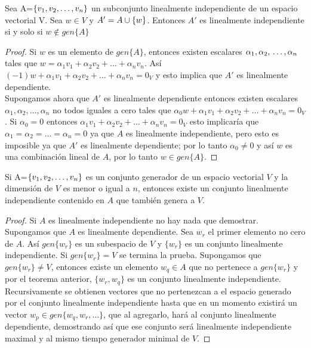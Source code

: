 %
%

\begin{theorem}
Sea A=$ \lbrace v_1, v_2, \ldots, v_n \rbrace$ un subconjunto linealmente independiente de un espacio vectorial V. Sea $w\in V$ y $A'=A\cup \left\{w \right\} $. Entonces $A'$ es linealmente independiente si y solo si $ w \notin gen\{A\}$
\end{theorem}
 
\begin{proof}
Si $w$ es un elemento de $gen\{A\}$, entonces existen escalares $\alpha_1, \alpha_2,\\ \hdots, \alpha_n$ tales que $w=\alpha_1v_1+\alpha_2v_2+\hdots+\alpha_nv_n$. Así $(-1)w+\alpha_1v_1+\alpha_2v_2+\hdots+\alpha_nv_n=0_V$ y esto implica que $A'$ es linealmente dependiente.\\
Supongamos ahora que $A'$ es linealmente dependiente entonces existen escalares  $\alpha_1, \alpha_2, \hdots, \alpha_n$ no todos iguales a cero tales que $\alpha_0w+\alpha_1v_1+\alpha_2v_2+\hdots+\alpha_nv_n=0_V$. Si $\alpha_0=0$ entonces $\alpha_1v_1+\alpha_2v_2+\hdots+\alpha_nv_n=0_V$ esto implicaría que $\alpha_1= \alpha_2= \hdots=\alpha_n=0$ ya que $A$ es linealmente independiente, pero esto es imposible ya que $A'$ es linealmente dependiente; por lo tanto $\alpha_0\neq0$ y así $w$ es una combinación lineal de $A$, por lo tanto $w\in gen\{A\}$.
\end{proof}
\begin{theorem}
Si  A=$ \lbrace v_1, v_2, \ldots, v_n \rbrace$ es un conjunto generador de un espacio vectorial $V$ y la dimensión de $V$ es menor o igual a $n$, entonces existe un conjunto linealmente independiente contenido en $A$ que también genera a $V$.
\end{theorem}

\begin{proof}
Si $A$ es linealmente independiente no hay nada que demostrar. Supongamos que $A$ es linealmente dependiente. Sea $w_r$ el primer elemento no cero de $A$. Así $gen\{w_r\}$ es un subespacio de $V$ y $\{w_r\}$ es un conjunto linealmente independiente. Si $gen\{w_r\}=V$ se termina la prueba. Supongamos que $gen\{w_r\}\neq V$, entonces existe un elemento $w_q \in A$ que no pertenece a $gen\{w_r\}$ y por el teorema anterior, $\{w_r,w_q\}$ es un conjunto linealmente independiente. Recursivamente se obtienen vectores que no pertenezcan a el espacio generado por el conjunto linealmente independiente hasta que en un momento existirá un vector $w_p \in gen\{w_q,w_r, \hdots \}$, que al agregarlo, hará al conjunto linealmente dependiente, demostrando así que ese conjunto será linealmente independiente maximal y al mismo tiempo generador minimal de $V$.

\end{proof} 



